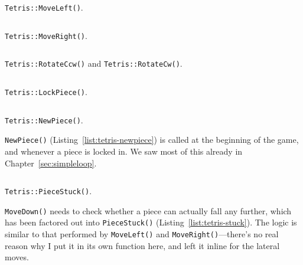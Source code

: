 \pagebreak

\begin{listing}[!htb]
\inputminted[]{C}{code-tetris/moveleft.h}
\caption{\texttt{Tetris::MoveLeft()}.}
\label{list:tetris-moveleft}
\end{listing}

\begin{listing}[!htb]
\inputminted[]{C}{code-tetris/moveright.h}
\caption{\texttt{Tetris::MoveRight()}.}
\label{list:tetris-moveright}
\end{listing}

\begin{listing}[!htb]
\inputminted[]{C}{code-tetris/rotate.h}
\caption{\texttt{Tetris::RotateCcw()} and \texttt{Tetris::RotateCw()}.}
\label{list:tetris-rotate}
\end{listing}

\begin{listing}[!htb]
\inputminted[]{C}{code-tetris/lock.h}
\caption{\texttt{Tetris::LockPiece()}.}
\label{list:tetris-lock}
\end{listing}

\begin{listing}[!htb]
\inputminted[]{C}{code-tetris/newpiece.h}
\caption{\texttt{Tetris::NewPiece()}.}
\label{list:tetris-newpiece}
\end{listing}

\texttt{NewPiece()} (Listing~\ref{list:tetris-newpiece}) is called at the
beginning of the game, and whenever a piece is locked in. We saw most of this
already in Chapter~\ref{sec:simpleloop}.

\pagebreak

\begin{listing}[!htb]
\inputminted[]{C}{code-tetris/stuck.h}
\caption{\texttt{Tetris::PieceStuck()}.}
\label{list:tetris-stuck}
\end{listing}

\texttt{MoveDown()} needs to check whether a piece can actually fall any
further, which has been factored out into \texttt{PieceStuck()}
(Listing~\ref{list:tetris-stuck}). The logic is similar to that performed by
\texttt{MoveLeft()} and \texttt{MoveRight()}---there's no real reason why I
put it in its own function here, and left it inline for the lateral moves.

